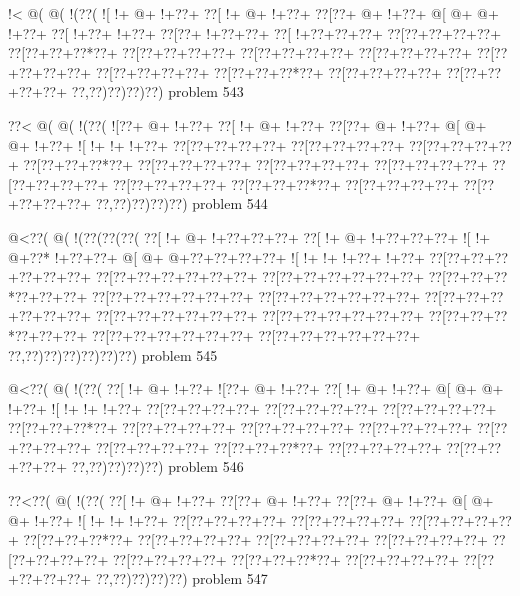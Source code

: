 \vbox{\vbox{\goo
\- !<\- @(\- @(\- !(\0??(
\- ![\- !+\- @+\- !+\0??+
\0??[\- !+\- @+\- !+\0??+
\0??[\0??+\- @+\- !+\0??+
\- @[\- @+\- @+\- !+\0??+
\0??[\- !+\0??+\- !+\0??+
\0??[\0??+\- !+\0??+\0??+
\0??[\- !+\0??+\0??+\0??+
\0??[\0??+\0??+\0??+\0??+
\0??[\0??+\0??+\0??*\0??+
\0??[\0??+\0??+\0??+\0??+
\0??[\0??+\0??+\0??+\0??+
\0??[\0??+\0??+\0??+\0??+
\0??[\0??+\0??+\0??+\0??+
\0??[\0??+\0??+\0??+\0??+
\0??[\0??+\0??+\0??*\0??+
\0??[\0??+\0??+\0??+\0??+
\0??[\0??+\0??+\0??+\0??+
\0??,\0??)\0??)\0??)\0??)
}
\hfil problem 543\hfil\break
}

\vbox{\vbox{\goo
\0??<\- @(\- @(\- !(\0??(
\- ![\0??+\- @+\- !+\0??+
\0??[\- !+\- @+\- !+\0??+
\0??[\0??+\- @+\- !+\0??+
\- @[\- @+\- @+\- !+\0??+
\- ![\- !+\- !+\- !+\0??+
\0??[\0??+\0??+\0??+\0??+
\0??[\0??+\0??+\0??+\0??+
\0??[\0??+\0??+\0??+\0??+
\0??[\0??+\0??+\0??*\0??+
\0??[\0??+\0??+\0??+\0??+
\0??[\0??+\0??+\0??+\0??+
\0??[\0??+\0??+\0??+\0??+
\0??[\0??+\0??+\0??+\0??+
\0??[\0??+\0??+\0??+\0??+
\0??[\0??+\0??+\0??*\0??+
\0??[\0??+\0??+\0??+\0??+
\0??[\0??+\0??+\0??+\0??+
\0??,\0??)\0??)\0??)\0??)
}
\hfil problem 544\hfil\break
}

\vbox{\vbox{\goo
\- @<\0??(\- @(\- !(\0??(\0??(\0??(
\0??[\- !+\- @+\- !+\0??+\0??+\0??+
\0??[\- !+\- @+\- !+\0??+\0??+\0??+
\- ![\- !+\- @+\0??*\- !+\0??+\0??+
\- @[\- @+\- @+\0??+\0??+\0??+\0??+
\- ![\- !+\- !+\- !+\0??+\- !+\0??+
\0??[\0??+\0??+\0??+\0??+\0??+\0??+
\0??[\0??+\0??+\0??+\0??+\0??+\0??+
\0??[\0??+\0??+\0??+\0??+\0??+\0??+
\0??[\0??+\0??+\0??*\0??+\0??+\0??+
\0??[\0??+\0??+\0??+\0??+\0??+\0??+
\0??[\0??+\0??+\0??+\0??+\0??+\0??+
\0??[\0??+\0??+\0??+\0??+\0??+\0??+
\0??[\0??+\0??+\0??+\0??+\0??+\0??+
\0??[\0??+\0??+\0??+\0??+\0??+\0??+
\0??[\0??+\0??+\0??*\0??+\0??+\0??+
\0??[\0??+\0??+\0??+\0??+\0??+\0??+
\0??[\0??+\0??+\0??+\0??+\0??+\0??+
\0??,\0??)\0??)\0??)\0??)\0??)\0??)
}
\hfil problem 545\hfil\break
}

\vbox{\vbox{\goo
\- @<\0??(\- @(\- !(\0??(
\0??[\- !+\- @+\- !+\0??+
\- ![\0??+\- @+\- !+\0??+
\0??[\- !+\- @+\- !+\0??+
\- @[\- @+\- @+\- !+\0??+
\- ![\- !+\- !+\- !+\0??+
\0??[\0??+\0??+\0??+\0??+
\0??[\0??+\0??+\0??+\0??+
\0??[\0??+\0??+\0??+\0??+
\0??[\0??+\0??+\0??*\0??+
\0??[\0??+\0??+\0??+\0??+
\0??[\0??+\0??+\0??+\0??+
\0??[\0??+\0??+\0??+\0??+
\0??[\0??+\0??+\0??+\0??+
\0??[\0??+\0??+\0??+\0??+
\0??[\0??+\0??+\0??*\0??+
\0??[\0??+\0??+\0??+\0??+
\0??[\0??+\0??+\0??+\0??+
\0??,\0??)\0??)\0??)\0??)
}
\hfil problem 546\hfil\break
}

\vbox{\vbox{\goo
\0??<\0??(\- @(\- !(\0??(
\0??[\- !+\- @+\- !+\0??+
\0??[\0??+\- @+\- !+\0??+
\0??[\0??+\- @+\- !+\0??+
\- @[\- @+\- @+\- !+\0??+
\- ![\- !+\- !+\- !+\0??+
\0??[\0??+\0??+\0??+\0??+
\0??[\0??+\0??+\0??+\0??+
\0??[\0??+\0??+\0??+\0??+
\0??[\0??+\0??+\0??*\0??+
\0??[\0??+\0??+\0??+\0??+
\0??[\0??+\0??+\0??+\0??+
\0??[\0??+\0??+\0??+\0??+
\0??[\0??+\0??+\0??+\0??+
\0??[\0??+\0??+\0??+\0??+
\0??[\0??+\0??+\0??*\0??+
\0??[\0??+\0??+\0??+\0??+
\0??[\0??+\0??+\0??+\0??+
\0??,\0??)\0??)\0??)\0??)
}
\hfil problem 547\hfil\break
}


